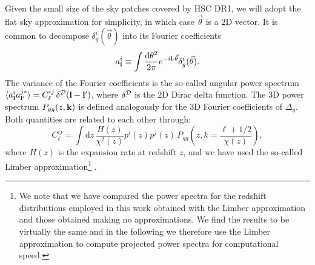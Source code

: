 \documentclass[a4paper,11pt]{article}
\newcommand{\nv}{\vec{\theta}}
\begin{document}
    Given the small size of the sky patches covered by HSC DR1, we will adopt the flat sky approximation for simplicity, in which case $\nv$ is a 2D vector. It is common to decompose $\delta^i_g(\nv)$ into its Fourier coefficients
    \begin{equation}
      a^i_{\bf l}\equiv \int\frac{\mathrm{d}\theta^2}{2\pi}e^{-i{\bf l}\cdot\nv}\delta^i_g(\nv).
    \end{equation}
    The variance of the Fourier coefficients is the so-called angular power spectrum $\langle a^i_{\bf l}a^{j*}_{{\bf l}'}\rangle = C^{ij}_\ell\,\delta^{\cal D}({\bf l}-{\bf l}')$, where $\delta^{\cal D}$ is the 2D Dirac delta function. The 3D power spectrum $P_{gg}(z,{\bf k})$ is defined analogously for the 3D Fourier coefficients of $\Delta_g$. Both quantities are related to each other through:
    \begin{equation}\label{eq:cell_gg_limber}
      C^{ij}_\ell = \int \mathrm{d}z\,\frac{H(z)}{\chi^2(z)} p^i(z)p^j(z)\,P_{gg}\left(z,k=\frac{\ell+1/2}{\chi(z)}\right),
    \end{equation}
    where $H(z)$ is the expansion rate at redshift $z$, and we have used the so-called Limber approximation\footnote{We note that we have compared the power spectra for the redshift distributions employed in this work obtained with the Limber approximation and those obtained making no approximations. We find the results to be virtually the same and in the following we therefore use the Limber approximation to compute projected power spectra for computational speed.} \citep{Limber:1953, Kaiser:1992, Kaiser:1998}.
\end{document}
